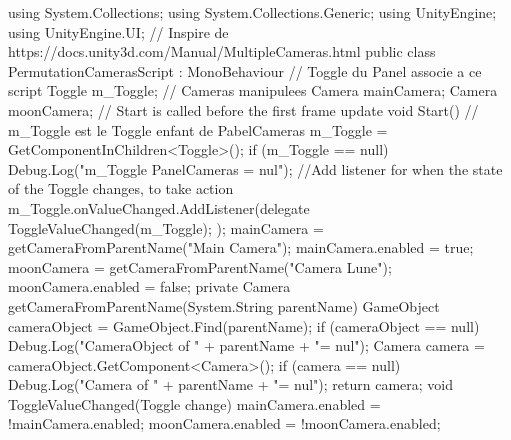 \documentclass[a4paper,10pt]{article}
\newenvironment{solution}%
{\begin{tcolorbox}[breakable,colback=red!5!white,colframe=red!75!black,title=Solution]}%
{\end{tcolorbox}}
\newenvironment{boxcode}%
{\begin{tcolorbox}[breakable,colback=gray!5!white,colframe=black]}%
	{\end{tcolorbox}}
\begin{document}
\begin{solution}
\begin{boxcode}
	\begin{csharpsansbord}
using System.Collections;
using System.Collections.Generic;
using UnityEngine;
using UnityEngine.UI;
// Inspire de https://docs.unity3d.com/Manual/MultipleCameras.html
public class PermutationCamerasScript : MonoBehaviour
{
	// Toggle du Panel associe a ce script
	Toggle m_Toggle;
	// Cameras manipulees
	Camera mainCamera;
	Camera moonCamera;
	// Start is called before the first frame update
	void Start()
	{
		// m_Toggle est le Toggle enfant de PabelCameras
		m_Toggle = GetComponentInChildren<Toggle>();
		if (m_Toggle == null)
		Debug.Log("m_Toggle PanelCameras = nul");
		//Add listener for when the state of the Toggle changes, to take action
		m_Toggle.onValueChanged.AddListener(delegate {
			ToggleValueChanged(m_Toggle);
		});
		mainCamera = getCameraFromParentName("Main Camera");
		mainCamera.enabled = true;
		moonCamera = getCameraFromParentName("Camera Lune");
		moonCamera.enabled = false;
	}
	private Camera getCameraFromParentName(System.String parentName) {
		GameObject cameraObject = GameObject.Find(parentName);
		if (cameraObject == null)
		Debug.Log("CameraObject of " + parentName + "= nul");
		Camera camera = cameraObject.GetComponent<Camera>();
		if (camera == null)
		Debug.Log("Camera of " + parentName + "= nul");
		return camera;
	}
	void ToggleValueChanged(Toggle change)
	{
		mainCamera.enabled = !mainCamera.enabled;
		moonCamera.enabled = !moonCamera.enabled;
	}
}	
\end{csharpsansbord}
\end{boxcode}
	

\end{solution}
\end{document}
